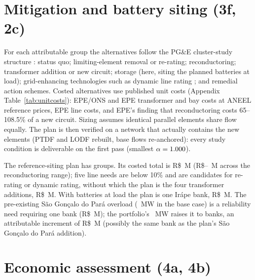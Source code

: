 \documentclass[10pt]{article}
\newcommand{\RS}{R\$}
\begin{document}
\section{Mitigation and battery siting (3f, 2c)}\label{sec:mitigation}
For each attributable group the alternatives follow the PG\&E cluster-study structure \citep{course_l12}: status quo; limiting-element
removal or re-rating; reconductoring; transformer addition or new circuit; storage (here, siting the planned batteries at load); grid-enhancing
technologies such as dynamic line rating \citep{course_l6}; and remedial action schemes. Costed alternatives use published unit costs
(Appendix Table~\ref{tab:unitcosts}): EPE/ONS and EPE transformer and bay costs at ANEEL reference prices, EPE line costs, and EPE's
finding that reconductoring costs 65--108.5\% of a new circuit. Sizing assumes identical parallel elements share flow equally. The plan is
then verified on a network that actually contains the new elements (PTDF and LODF rebuilt, base flows re-anchored): every study condition is
deliverable on the first pass (smallest $\alpha=1.000$).



The reference-siting plan has \NgroupsR{} groups. Its costed total is \RS\NcapexR~M (\RS\NcapexlowR--\NcapexhighR~M across the
reconductoring range); five line needs are below 10\% and are candidates for re-rating or dynamic rating, without which the plan is the four
transformer additions, \RS\NcapexexclR~M. With batteries at load the plan is one Ir\'ape bank, \RS\NcapexL~M. The pre-existing
S\~ao Gon\c{c}alo do Par\'a overload (\Nprebase~MW in the base case) is a reliability need requiring one bank (\RS\Nprecapexbase~M); the
portfolio's \Npreadd~MW raises it to \Nprebanks{} banks, an attributable increment of \RS\Nprecapexinc~M (possibly the same bank as the
plan's S\~ao Gon\c{c}alo do Par\'a addition).

\section{Economic assessment (4a, 4b)}\label{sec:pcm}
\end{document}
